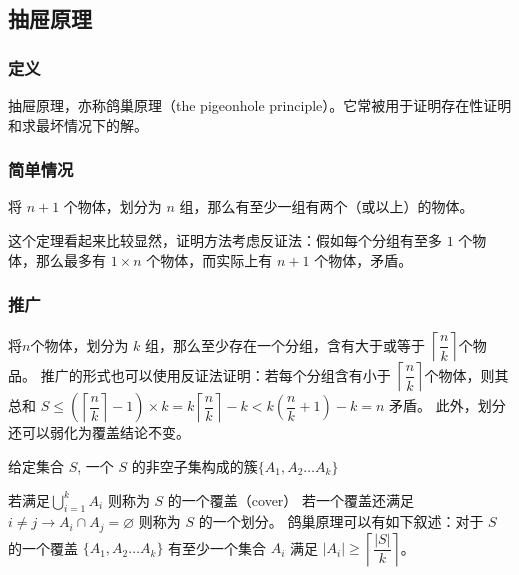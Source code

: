 \subsection{抽屉原理}
\label{sec:drawer-principle}

\subsubsection{定义}

抽屉原理，亦称鸽巢原理（the pigeonhole principle）。它常被用于证明存在性证明和求最坏情况下的解。

\subsubsection{简单情况}

将 \(n+1\) 个物体，划分为 \(n\) 组，那么有至少一组有两个（或以上）的物体。

这个定理看起来比较显然，证明方法考虑反证法：假如每个分组有至多 \(1\) 个物体，那么最多有 \(1 \times n\) 个物体，而实际上有 \( n + 1 \) 个物体，矛盾。

\subsubsection{推广}

将\(n\)个物体，划分为 \(k\) 组，那么至少存在一个分组，含有大于或等于 \( \left \lceil \dfrac{n}{k} \right \rceil \)个物品。
推广的形式也可以使用反证法证明：若每个分组含有小于 \( \left \lceil \dfrac{n}{k} \right \rceil \)个物体，则其总和 \(S\leq (\left \lceil \dfrac{n}{k} \right \rceil -1 ) \times k=k\left\lceil \dfrac{n}{k} \right\rceil-k < k(\dfrac{n}{k}+1)-k=n \) 矛盾。
此外，划分还可以弱化为覆盖结论不变。

给定集合 \(S\), 一个 \(S\) 的非空子集构成的簇\(\{A_1,A_2\ldots A_k\}\)

若满足\(\bigcup_{i=1}^k A_i\) 则称为 \(S\) 的一个覆盖（cover）
若一个覆盖还满足\(i\neq j\to A_i\cap A_j=\varnothing\) 则称为 \(S\) 的一个划分。
鸽巢原理可以有如下叙述：对于 \(S\) 的一个覆盖 \(\{A_1,A_2\ldots A_k\}\) 有至少一个集合 \(A_i\) 满足
\(\left\vert A_i \right\vert \geq \left\lceil \dfrac{\left\vert S \right\vert}{k} \right\rceil\)。


